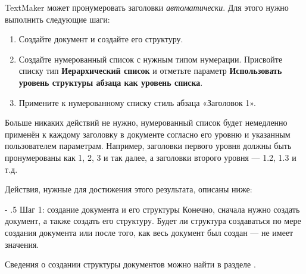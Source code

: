 ﻿\documentclass[a4paper,10pt]{article}
\makeatletter
\renewcommand\paragraph{%
   \@startsection{paragraph}{4}{0mm}%
      {-\baselineskip}%
      {.5\baselineskip}%
      {\normalfont\normalsize\bfseries}}
\makeatother
\begin{document}
TextMaker может пронумеровать заголовки \textit{автоматически}. Для этого нужно выполнить следующие шаги:

\begin{enumerate}
 \item Создайте документ и создайте его структуру.
 \item Создайте нумерованный список с нужным типом нумерации. Присвойте списку тип \textbf{Иерархический список} и отметьте параметр \textbf{Использовать уровень структуры абзаца как уровень списка}.
 \item Примените к нумерованному списку стиль абзаца «Заголовок 1».
 \end{enumerate}
 
 Больше никаких действий не нужно, нумерованный список будет немедленно применён к каждому заголовку в документе согласно его уровню и указанным пользователем параметрам. Например, заголовки первого уровня должны быть пронумерованы как 1, 2, 3 и так далее, а заголовки второго уровня — 1.2, 1.3 и т.д.
 
 Действия, нужные для достижения этого результата, описаны ниже:
 
 \paragraph{Шаг 1: создание документа и его структуры}
 Конечно, сначала нужно создать документ, а также создать его структуру. Будет ли структура создаваться по мере создания документа или после того, как весь документ был создан — не имеет значения.
 
 Сведения о создании структуры документов можно найти в разделе .
 
\end{document}

